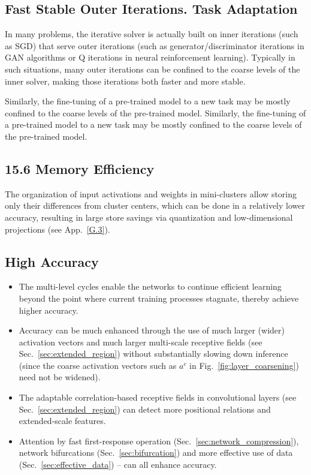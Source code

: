 \documentclass{article} %
\begin{document}
\subsection{Fast Stable Outer Iterations. Task Adaptation}
\label{sec:out_iteration}
In many problems, the iterative solver is actually built on inner iterations (such as SGD) that serve outer iterations (such as generator/discriminator iterations in GAN algorithms or Q iterations in neural reinforcement learning). Typically in such situations, many outer iterations can be confined to the coarse levels of the inner solver, making those iterations both faster and more stable.

Similarly, the fine-tuning of a pre-trained model to a new task may be mostly confined to the coarse levels of the pre-trained model. Similarly, the fine-tuning of a pre-trained model to a new task may be mostly confined to the coarse levels of the pre-trained model.

\subsection{15.6 Memory Efficiency}
The organization of input activations and weights in mini-clusters allow storing only their differences from cluster centers, which can be done in a relatively lower accuracy, resulting in large store savings via quantization and low-dimensional projections (see App.~\ref{G.3}).

\subsection{High Accuracy}
\label{sec:high_accuracy}
\begin{itemize}
\item The multi-level cycles enable the networks to continue efficient learning beyond the point where current training processes stagnate, thereby achieve higher accuracy.
\item Accuracy can be much enhanced through the use of much larger (wider) activation vectors and much larger multi-scale receptive fields (see Sec.~\ref{sec:extended_region}) without substantially slowing down inference (since the coarse activation vectors such as $a^c$ in Fig.~\ref{fig:layer_coarsening}) need not be widened).
\item The adaptable correlation-based receptive fields in convolutional layers (see Sec.~\ref{sec:extended_region}) can detect more positional relations and extended-scale features.
  \item Attention by fast first-response operation (Sec.~\ref{sec:network_compression}), network bifurcations (Sec.~\ref{sec:bifurcation}) and more effective use of data (Sec.~\ref{sec:effective_data}) -- can all enhance accuracy.
\end{itemize}
\end{document}
